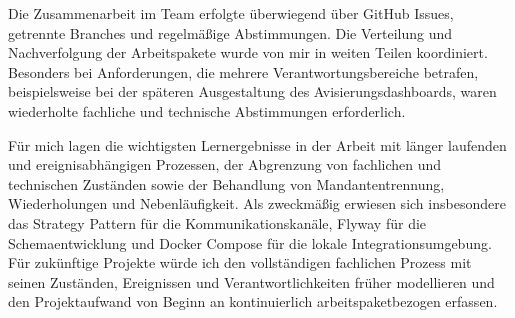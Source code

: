 \documentclass[
  12pt,
  a4paper,
  oneside
]{article}
\begin{document}
Die Zusammenarbeit im Team erfolgte überwiegend über GitHub Issues,
getrennte Branches und regelmäßige Abstimmungen. Die Verteilung und
Nachverfolgung der Arbeitspakete wurde von mir in weiten Teilen
koordiniert. Besonders bei Anforderungen, die mehrere
Verantwortungsbereiche betrafen, beispielsweise bei der späteren
Ausgestaltung des Avisierungsdashboards, waren wiederholte fachliche
und technische Abstimmungen erforderlich.

Für mich lagen die wichtigsten Lernergebnisse in der Arbeit mit
länger laufenden und ereignisabhängigen Prozessen, der Abgrenzung von
fachlichen und technischen Zuständen sowie der Behandlung von
Mandantentrennung, Wiederholungen und Nebenläufigkeit. Als zweckmäßig
erwiesen sich insbesondere das Strategy Pattern für die
Kommunikationskanäle, Flyway für die Schemaentwicklung und Docker
Compose für die lokale Integrationsumgebung. Für zukünftige Projekte
würde ich den vollständigen fachlichen Prozess mit seinen Zuständen,
Ereignissen und Verantwortlichkeiten früher modellieren und den
Projektaufwand von Beginn an kontinuierlich arbeitspaketbezogen
erfassen.
\end{document}
